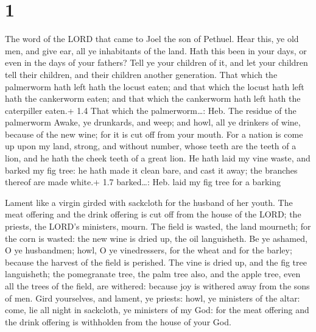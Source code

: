 \hypertarget{section}{%
\section{1}\label{section}}

 The word of the LORD that came to Joel the son of Pethuel.
 Hear this, ye old men, and give ear, all ye inhabitants of
the land. Hath this been in your days, or even in the days of your
fathers?  Tell ye your children of it, and let your children
tell their children, and their children another generation. 
That which the palmerworm hath left hath the locust eaten; and that
which the locust hath left hath the cankerworm eaten; and that which the
cankerworm hath left hath the caterpiller eaten.+ 1.4 That which the
palmerworm\ldots: Heb. The residue of the palmerworm  Awake,
ye drunkards, and weep; and howl, all ye drinkers of wine, because of
the new wine; for it is cut off from your mouth.  For a
nation is come up upon my land, strong, and without number, whose teeth
are the teeth of a lion, and he hath the cheek teeth of a great lion.
 He hath laid my vine waste, and barked my fig tree: he hath
made it clean bare, and cast it away; the branches thereof are made
white.+ 1.7 barked\ldots: Heb. laid my fig tree for a barking

 Lament like a virgin girded with sackcloth for the
husband of her youth.  The meat offering and the drink
offering is cut off from the house of the LORD; the priests, the LORD's
ministers, mourn.  The field is wasted, the land mourneth;
for the corn is wasted: the new wine is dried up, the oil languisheth.
 Be ye ashamed, O ye husbandmen; howl, O ye vinedressers,
for the wheat and for the barley; because the harvest of the field is
perished.  The vine is dried up, and the fig tree
languisheth; the pomegranate tree, the palm tree also, and the apple
tree, even all the trees of the field, are withered: because joy is
withered away from the sons of men.  Gird yourselves, and
lament, ye priests: howl, ye ministers of the altar: come, lie all night
in sackcloth, ye ministers of my God: for the meat offering and the
drink offering is withholden from the house of your God.

